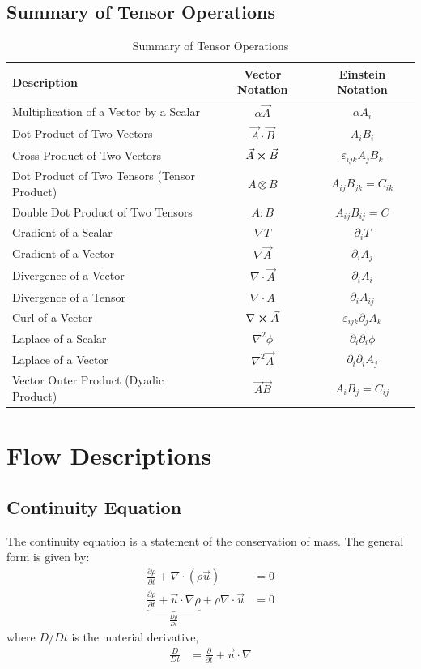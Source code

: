\subsection{Summary of Tensor Operations}
\begin{table}[H]
    \centering
    \caption{Summary of Tensor Operations}
    \begin{tabular}{p{}cc}
        \toprule
        Description & Vector Notation & Einstein Notation \\
        \midrule
        Multiplication of a Vector by a Scalar & $\alpha \vec{A}$ & $\alpha A_i$ \\
        Dot Product of Two Vectors & $\vec{A} \cdot \vec{B}$ & $A_i B_i$ \\
        Cross Product of Two Vectors & $\vec{A} \cross \vec{B}$ & $\varepsilon_{ijk}A_jB_k$ \\
        Dot Product of Two Tensors (Tensor Product) & $A \otimes B$ & $A_{ij}B_{jk}= C_{ik}$ \\
        Double Dot Product of Two Tensors & $A : B$ & $A_{ij}B_{ij} = C$ \\
        Gradient of a Scalar & $\nabla T$ & $\partial_{i} T$ \\
        Gradient of a Vector & $\nabla \vec{A}$ & $\partial_{i} A_j$ \\
        Divergence of a Vector & $\nabla \cdot \vec{A}$ & $\partial_{i} A_i$ \\
        Divergence of a Tensor & $\nabla \cdot A$ & $\partial_{i} A_{ij}$ \\
        Curl of a Vector & $\nabla \cross \vec{A}$ & $\varepsilon_{ijk}\partial_{j} A_k$ \\
        Laplace of a Scalar & $\nabla^2 \phi$ & $\partial_{i} \partial_{i} \phi$ \\
        Laplace of a Vector & $\nabla^2 \vec{A}$ & $\partial_{i} \partial_{i} A_j$ \\
        Vector Outer Product (Dyadic Product) & $\vec{A} \vec{B}$ & $A_i B_j = C_{ij}$ \\
        \bottomrule
    \end{tabular}
\end{table}

\section{Flow Descriptions}
\subsection{Continuity Equation}
The continuity equation is a statement of the conservation of mass. The general form is given by:
\begin{align*}
    \frac{\partial \rho}{\partial t} + \nabla \cdot (\rho \vec{u}) &= 0  \\
    \underbrace{\frac{\partial \rho}{\partial t} + \vec{u} \cdot \nabla \rho}_{\frac{D\rho}{Dt}} + \rho \nabla \cdot \vec{u} &= 0
\end{align*}
where $D/Dt$ is the material derivative,
\begin{align*}
    \frac{D}{Dt} &= \frac{\partial}{\partial t} + \vec{u} \cdot \nabla
\end{align*}

